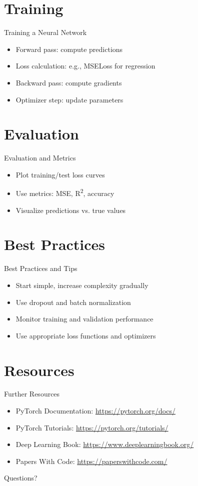 \documentclass{beamer}
\begin{document}
\section{Training}
\begin{frame}{Training a Neural Network}
  \begin{itemize}
    \item Forward pass: compute predictions
    \item Loss calculation: e.g., MSELoss for regression
    \item Backward pass: compute gradients
    \item Optimizer step: update parameters
  \end{itemize}
\end{frame}

\section{Evaluation}
\begin{frame}{Evaluation and Metrics}
  \begin{itemize}
    \item Plot training/test loss curves
    \item Use metrics: MSE, R\textsuperscript{2}, accuracy
    \item Visualize predictions vs. true values
  \end{itemize}
\end{frame}

\section{Best Practices}
\begin{frame}{Best Practices and Tips}
  \begin{itemize}
    \item Start simple, increase complexity gradually
    \item Use dropout and batch normalization
    \item Monitor training and validation performance
    \item Use appropriate loss functions and optimizers
  \end{itemize}
\end{frame}

\section{Resources}
\begin{frame}{Further Resources}
  \begin{itemize}
    \item PyTorch Documentation: \url{https://pytorch.org/docs/}
    \item PyTorch Tutorials: \url{https://pytorch.org/tutorials/}
    \item Deep Learning Book: \url{https://www.deeplearningbook.org/}
    \item Papers With Code: \url{https://paperswithcode.com/}
  \end{itemize}
\end{frame}

\begin{frame}
  \centering
  \Huge Questions?
\end{frame}
\end{document}
